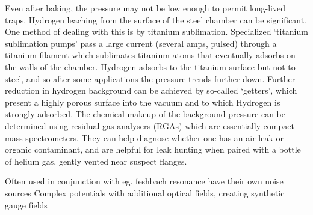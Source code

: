 	Even after baking, the pressure may not be low enough to permit long-lived traps.
	Hydrogen leaching from the surface of the steel chamber can be significant.
	One method of dealing with this is by titanium sublimation.
	Specialized `titanium sublimation pumps' pass a large current (several amps, pulsed) through a titanium filament which sublimates titanium atoms that eventually adsorbs on the walls of the chamber.
	Hydrogen adsorbs to the titanium surface but not to steel, and so after some applications the pressure trends further down.
	Further reduction in hydrogen background can be achieved by so-called `getters', which present a highly porous surface into the vacuum and to which Hydrogen is strongly adsorbed.
	The chemical makeup of the background pressure can be determined using residual gas analysers (RGAs) which are essentially compact mass spectrometers.
	They can help diagnose whether one has an air leak or organic contaminant, and are helpful for leak hunting when paired with a bottle of helium gas, gently vented near suspect flanges.

	
	




		
	Often used in conjunction with eg.
	feshbach resonance 
	have their own noise sources
		\cite{Pichler10}%
	Complex potentials with additional optical fields, creating synthetic gauge fields
		\cite{Aidelsburger11,Aidelsburger13,Miyake13}


